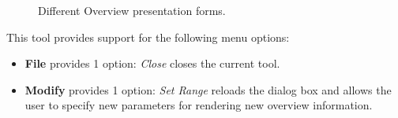 \documentclass[10pt]{article}
\begin{document}
\begin{figure}[!ht]
  \centering
  \caption{Different Overview presentation forms.}
  \label{overview forms}
\end{figure}

%

This tool provides support for the following menu options:

\begin{itemize}
\item {\bf File} provides 1 option: {\it Close} closes the current tool.
\item {\bf Modify} provides 1 option: {\it Set Range} reloads the
dialog box and allows the user to specify new parameters for rendering
new overview information.
\end{itemize}
\end{document}
